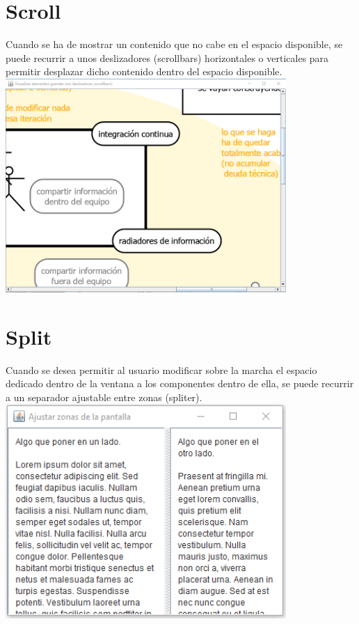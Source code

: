 \documentclass[spanish,12pt,a4paper,final,oneside]{book}
\begin{document}
\section{Scroll}\label{ejercicio_scroll}
Cuando se ha de mostrar un contenido que no cabe en el espacio disponible, se puede recurrir a unos deslizadores (scrollbars) horizontales o verticales para permitir desplazar dicho contenido dentro del espacio disponible.
\\ \includegraphics[width=0.8\textwidth]{Scroll - pantallazo - Java}

\section{Split}\label{ejercicio_split}
Cuando se desea permitir al usuario modificar sobre la marcha el espacio dedicado dentro de la ventana a los componentes dentro de ella, se puede recurrir a un separador ajustable entre zonas (spliter).
\\ \includegraphics[width=0.8\textwidth]{Split - pantallazo - Java}
\end{document}
